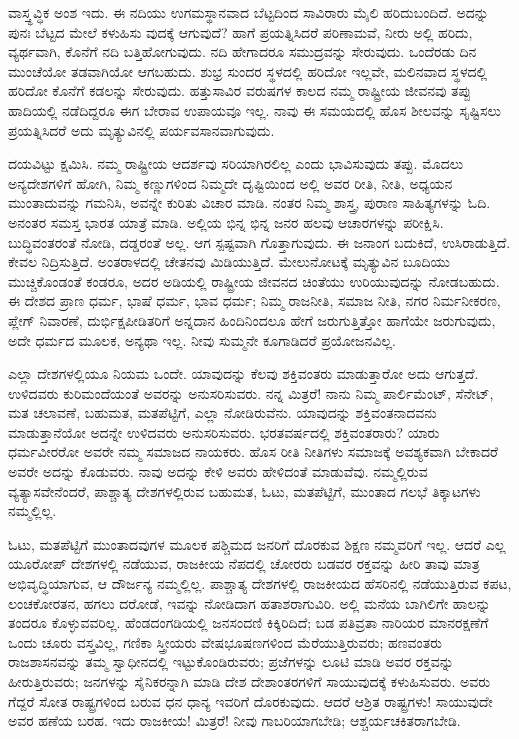 ವಾಸ್ತ್ಧವ್ಧಿಕ ಅಂಶ ಇದು. ಈ ನದಿಯು ಉಗಮಸ್ಥಾನವಾದ ಬೆಟ್ಟದಿಂದ ಸಾವಿರಾರು ಮೈಲಿ ಹರಿದುಬಂದಿದೆ. ಅದನ್ನು ಪುನಃ ಬೆಟ್ಟದ ಮೇಲೆ ಕಳುಹಿಸು ವುದಕ್ಕೆ ಆಗುವುದೆ? ಹಾಗೆ ಪ್ರಯತ್ನಿಸಿದರೆ ಪರಿಣಾಮವೆ, ನೀರು ಅಲ್ಲಿ ಹರಿದು, ವ್ಯರ್ಥವಾಗಿ, ಕೊನೆಗೆ ನದಿ ಬತ್ತಿಹೋಗುವುದು. ನದಿ ಹೇಗಾದರೂ ಸಮುದ್ರವನ್ನು ಸೇರುವುದು. ಒಂದೆರಡು ದಿನ ಮುಂಚೆಯೋ ತಡವಾಗಿಯೋ ಆಗಬಹುದು. ಶುಭ್ರ ಸುಂದರ ಸ್ಥಳದಲ್ಲಿ ಹರಿದೋ ಇಲ್ಲವೇ, ಮಲಿನವಾದ ಸ್ಥಳದಲ್ಲಿ ಹರಿದೋ ಕೊನೆಗೆ ಕಡಲನ್ನು ಸೇರುವುದು. ಹತ್ತುಸಾವಿರ ವರುಷಗಳ ಕಾಲದ ನಮ್ಮ ರಾಷ್ಟ್ರೀಯ ಜೀವನವು ತಪ್ಪು ಹಾದಿಯಲ್ಲಿ ನಡೆದಿದ್ದರೂ ಈಗ ಬೇರಾವ ಉಪಾಯವೂ ಇಲ್ಲ. ನಾವು ಈ ಸಮಯದಲ್ಲಿ ಹೊಸ ಶೀಲವನ್ನು ಸೃಷ್ಟಿಸಲು ಪ್ರಯತ್ನಿಸಿದರೆ ಅದು ಮೃತ್ಯುವಿನಲ್ಲಿ ಪರ್ಯವಸಾನವಾಗುವುದು.

ದಯವಿಟ್ಟು ಕ್ಷಮಿಸಿ. ನಮ್ಮ ರಾಷ್ಟ್ರೀಯ ಆದರ್ಶವು ಸರಿಯಾಗಿರಲಿಲ್ಲ ಎಂದು ಭಾವಿಸುವುದು ತಪ್ಪು. ಮೊದಲು ಅನ್ಯದೇಶಗಳಿಗೆ ಹೋಗಿ, ನಿಮ್ಮ ಕಣ್ಣುಗಳಿಂದ ನಿಮ್ಮದೇ ದೃಷ್ಟಿಯಿಂದ ಅಲ್ಲಿ ಅವರ ರೀತಿ, ನೀತಿ, ಅಧ್ಯಯನ ಮುಂತಾದುವನ್ನು ಗಮನಿಸಿ, ಅವನ್ನೇ ಕುರಿತು ವಿಚಾರ ಮಾಡಿ. ನಂತರ ನಿಮ್ಮ ಶಾಸ್ತ್ರ, ಪುರಾಣ ಸಾಹಿತ್ಯಗಳನ್ನು ಓದಿ. ಅನಂತರ ಸಮಸ್ತ ಭಾರತ ಯಾತ್ರೆ ಮಾಡಿ. ಅಲ್ಲಿಯ ಭಿನ್ನ ಭಿನ್ನ ಜನರ ಹಲವು ಆಚಾರಗಳನ್ನು ಪರೀಕ್ಷಿಸಿ. ಬುದ್ಧಿವಂತರಂತೆ ನೋಡಿ, ದಡ್ಡರಂತೆ ಅಲ್ಲ. ಆಗ ಸ್ಪಷ್ಟವಾಗಿ ಗೊತ್ತಾಗುವುದು. ಈ ಜನಾಂಗ ಬದುಕಿದೆ, ಉಸಿರಾಡುತ್ತಿದೆ. ಕೇವಲ ನಿದ್ರಿಸುತ್ತಿದೆ. ಅಂತರಾಳದಲ್ಲಿ ಚೇತನವು ಮಿಡಿಯುತ್ತಿದೆ. ಮೇಲುನೋಟಕ್ಕೆ ಮೃತ್ಯುವಿನ ಬೂದಿಯು ಮುಚ್ಚಿಕೊಂಡಂತೆ ಕಂಡರೂ, ಅದರ ಅಡಿಯಲ್ಲಿ ರಾಷ್ಟ್ರೀಯ ಜೀವನದ ಚಿಂತೆಯು ಉರಿಯುವುದನ್ನು ನೋಡಬಹುದು. ಈ ದೇಶದ ಪ್ರಾಣ ಧರ್ಮ, ಭಾಷೆ ಧರ್ಮ, ಭಾವ ಧರ್ಮ; ನಿಮ್ಮ ರಾಜನೀತಿ, ಸಮಾಜ ನೀತಿ, ನಗರ ನಿರ್ಮನೀಕರಣ, ಪ್ಲೇಗ್​ ನಿವಾರಣೆ, ದುರ್ಭಿಕ್ಷಪೀಡಿತರಿಗೆ ಅನ್ನದಾನ ಹಿಂದಿನಿಂದಲೂ ಹೇಗೆ ಜರುಗುತ್ತಿತ್ತೋ ಹಾಗೆಯೇ ಜರುಗುವುದು, ಅದೇ ಧರ್ಮದ ಮೂಲಕ, ಅನ್ಯಥಾ ಇಲ್ಲ. ನೀವು ಸುಮ್ಮನೇ ಕೂಗಾಡಿದರೆ ಪ್ರಯೋಜನವಿಲ್ಲ.

ಎಲ್ಲಾ ದೇಶಗಳಲ್ಲಿಯೂ ನಿಯಮ ಒಂದೇ. ಯಾವುದನ್ನು ಕೆಲವು ಶಕ್ತಿವಂತರು ಮಾಡುತ್ತಾರೋ ಅದು ಆಗುತ್ತದೆ. ಉಳಿದವರು ಕುರಿಮಂದೆಯಂತೆ ಅವರನ್ನು ಅನುಸರಿಸುವರು. ನನ್ನ ಮಿತ್ರರೆ! ನಾನು ನಿಮ್ಮ ಪಾರ್ಲಿಮೆಂಟ್​, ಸೆನೇಟ್​, ಮತ ಚಲಾವಣೆ, ಬಹುಮತ, ಮತಪೆಟ್ಟಿಗೆ, ಎಲ್ಲಾ ನೋಡಿರುವೆನು. ಯಾವುದನ್ನು ಶಕ್ತಿವಂತನಾದವನು ಮಾಡುತ್ತಾನೆಯೋ ಅದನ್ನೇ ಉಳಿದವರು ಅನುಸರಿಸುವರು. ಭರತವರ್ಷದಲ್ಲಿ ಶಕ್ತಿವಂತರಾರು? ಯಾರು ಧರ್ಮವೀರರೋ ಅವರೇ ನಮ್ಮ ಸಮಾಜದ ನಾಯಕರು. ಹೊಸ ರೀತಿ ನೀತಿಗಳು ಸಮಾಜಕ್ಕೆ ಅವಶ್ಯಕವಾಗಿ ಬೇಕಾದರೆ ಅವರೇ ಅದನ್ನು ಕೊಡುವರು. ನಾವು ಅದನ್ನು ಕೇಳಿ ಅವರು ಹೇಳಿದಂತೆ ಮಾಡುವೆವು. ನಮ್ಮಲ್ಲಿರುವ ವ್ಯತ್ಯಾಸವೇನೆಂದರೆ, ಪಾಶ್ಚಾತ್ಯ ದೇಶಗಳಲ್ಲಿರುವ ಬಹುಮತ, ಓಟು, ಮತಪೆಟ್ಟಿಗೆ, ಮುಂತಾದ ಗಲಭೆ ತಿಕ್ಕಾಟಗಳು ನಮ್ಮಲ್ಲಿಲ್ಲ.

ಓಟು, ಮತಪೆಟ್ಟಿಗೆ ಮುಂತಾದವುಗಳ ಮೂಲಕ ಪಶ್ಚಿಮದ ಜನರಿಗೆ ದೊರಕುವ ಶಿಕ್ಷಣ ನಮ್ಮವರಿಗೆ ಇಲ್ಲ. ಆದರೆ ಎಲ್ಲ ಯೂರೋಪ್​ ದೇಶಗಳಲ್ಲಿ ನಡೆಯುವ, ರಾಜಕೀಯ ನೆಪದಲ್ಲಿ ಚೋರರು ಬಡವರ ರಕ್ತವನ್ನು ಹೀರಿ ತಾವು ಮಾತ್ರ ಅಭಿವೃದ್ಧಿಯಾಗುವ, ಆ ದೌರ್ಜನ್ಯ ನಮ್ಮಲ್ಲಿಲ್ಲ. ಪಾಶ್ಚಾತ್ಯ ದೇಶಗಳಲ್ಲಿ ರಾಜಕೀಯದ ಹೆಸರಿನಲ್ಲಿ ನಡೆಯುತ್ತಿರುವ ಕಪಟ, ಲಂಚಕೋರತನ, ಹಗಲು ದರೋಡೆ, ಇವನ್ನು ನೋಡಿದಾಗ ಹತಾಶರಾಗುವಿರಿ. ಅಲ್ಲಿ ಮನೆಯ ಬಾಗಿಲಿಗೇ ಹಾಲನ್ನು ತಂದರೂ ಕೊಳ್ಳುವವರಿಲ್ಲ. ಹೆಂಡದಂಗಡಿಯಲ್ಲಿ ಜನಸಂದಣಿ ಕಿಕ್ಕಿರಿದಿದೆ; ಬಡ ಪತಿವ್ರತಾ ನಾರಿಯರ ಮಾನರಕ್ಷಣೆಗೆ ಒಂದು ಚೂರು ವಸ್ತ್ರವಿಲ್ಲ, ಗಣಿಕಾ ಸ್ತ್ರೀಯರು ವೇಷಭೂಷಣಗಳಿಂದ ಮೆರೆಯುತ್ತಿರುವರು; ಹಣವಂತರು ರಾಜಶಾಸನವನ್ನು ತಮ್ಮ ಸ್ವಾಧೀನದಲ್ಲಿ ಇಟ್ಟುಕೊಂಡಿರುವರು; ಪ್ರಜೆಗಳನ್ನು ಲೂಟಿ ಮಾಡಿ ಅವರ ರಕ್ತವನ್ನು ಹೀರುತ್ತಿರುವರು; ಜನಗಳನ್ನು ಸೈನಿಕರನ್ನಾಗಿ ಮಾಡಿ ದೇಶ ದೇಶಾಂತರಗಳಿಗೆ ಸಾಯುವುದಕ್ಕೆ ಕಳುಹಿಸುವರು. ಅವರು ಗೆದ್ದರೆ ಸೋತ ರಾಷ್ಟ್ರಗಳಿಂದ ಬರುವ ಧನ ಧಾನ್ಯ ಇವರಿಗೆ ದೊರಕುವುದು. ಆದರೆ ಆಶ್ರಿತ ರಾಷ್ಟ್ರಗಳು! ಸಾಯುವುದೇ ಅವರ ಹಣೆಯ ಬರಹ. ಇದು ರಾಜಕೀಯ! ಮಿತ್ರರೆ! ನೀವು ಗಾಬರಿಯಾಗಬೇಡಿ; ಆಶ್ಚರ್ಯಚಕಿತರಾಗಬೇಡಿ.

